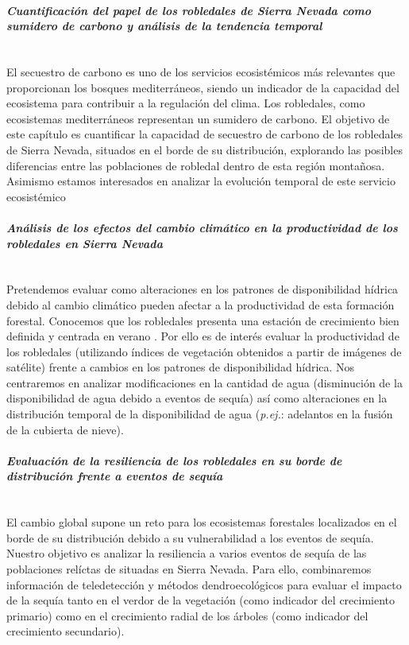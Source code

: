 \paragraph{\emph{Cuantificación del papel de los robledales de Sierra Nevada como sumidero de carbono y análisis de la tendencia temporal}} \mbox{} \\
El secuestro de carbono es uno de los servicios ecosistémicos más relevantes que proporcionan los bosques mediterráneos, siendo un indicador de la capacidad del ecosistema para contribuir a la regulación del clima. Los robledales, como ecosistemas mediterráneos representan un sumidero de carbono. El objetivo de este capítulo es cuantificar la capacidad  de secuestro de carbono de los robledales de Sierra Nevada, situados en el borde de su distribución, explorando las posibles diferencias entre las poblaciones de robledal dentro de esta región montañosa. Asimismo estamos interesados en analizar la evolución temporal de este servicio ecosistémico 

\paragraph{\emph{Análisis de los efectos del cambio climático en la productividad de los robledales en Sierra Nevada}} \mbox{} \\
Pretendemos evaluar como alteraciones en los patrones de disponibilidad hídrica debido al cambio climático pueden afectar a la productividad de esta formación forestal. Conocemos que los robledales presenta una estación de crecimiento bien definida y centrada en verano . Por ello es de interés evaluar la productividad de los robledales (utilizando índices de vegetación obtenidos a partir de imágenes de satélite) frente a cambios en los patrones de disponibilidad hídrica. Nos centraremos en analizar modificaciones en la cantidad de agua (disminución de la disponibilidad de agua debido a eventos de sequía) así como alteraciones en la distribución temporal de la disponibilidad de agua (\emph{p.ej.}: adelantos en la fusión de la cubierta de nieve).

\paragraph{\emph{Evaluación de la resiliencia de los robledales en su borde de distribución frente a eventos de sequía}}\mbox{} \\
El cambio global supone un reto para los ecosistemas forestales localizados en el borde de su distribución debido a su vulnerabilidad a los eventos de sequía. Nuestro objetivo es analizar la resiliencia a varios eventos de sequía de las poblaciones relíctas de \Qp situadas en Sierra Nevada. Para ello, combinaremos información de teledetección y métodos dendroecológicos para evaluar el impacto de la sequía tanto en el verdor de la vegetación (como indicador del crecimiento primario) como en el crecimiento radial de los árboles (como indicador del crecimiento secundario).

